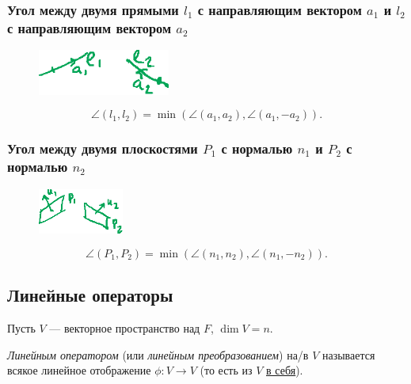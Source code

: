 \subsubsection{Угол между двумя прямыми $l_1$ с направляющим вектором $a_1$ и $l_2$ с направляющим вектором $a_2$}

{
\begin{figure}
    \vspace{-10pt}
    \includegraphics[height=1.5cm]{lecture27_drawing_5}
\end{figure}

\begin{equation*}
    \angle (l_1, l_2) = \min(\angle(a_1, a_2), \angle(a_1, -a_2))
.\end{equation*}
}

\subsubsection{Угол между двумя плоскостями $P_1$ с нормалью $n_1$ и $P_2$ с нормалью $n_2$}

{
\begin{figure}
    \vspace{-10pt}
    \includegraphics[height=1.5cm]{lecture27_drawing_6}
\end{figure}

\begin{equation*}
    \angle(P_1, P_2) = \min (\angle(n_1, n_2), \angle(n_1, -n_2))
.\end{equation*}
}


\subsection{Линейные операторы}

Пусть $V$ --- векторное пространство над $F$, $\dim V = n$.

\begin{definition}
\textit{Линейным оператором} (или \textit{линейным преобразованием}) на/в $V$ называется всякое линейное отображение $\phi \colon V \to V$ (то есть из $V$ \underline{\underline{в себя}}).
\end{definition}

